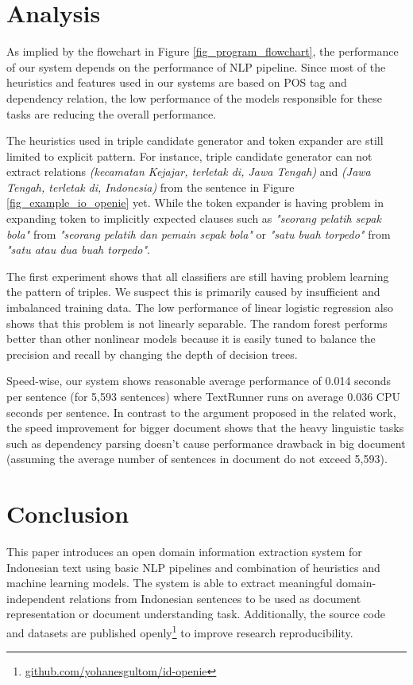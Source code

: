 \documentclass[conference,compsoc]{IEEEtran}
\begin{document}
\section{Analysis}

As implied by the flowchart in Figure \ref{fig_program_flowchart}, the performance of our system depends on the performance of NLP pipeline. Since most of the heuristics and features used in our systems are based on POS tag and dependency relation, the low performance of the models responsible for these tasks are reducing the overall performance.

The heuristics used in triple candidate generator and token expander are still limited to explicit pattern. For instance, triple candidate generator can not extract relations \textit{(kecamatan Kejajar, terletak di, Jawa Tengah)} and \textit{(Jawa Tengah, terletak di, Indonesia)} from the sentence in Figure \ref{fig_example_io_openie} yet. While the token expander is having problem in expanding token to implicitly expected clauses such as \textit{"seorang pelatih sepak bola"} from \textit{"seorang pelatih dan pemain sepak bola"} or \textit{"satu buah torpedo"} from \textit{"satu atau dua buah torpedo"}.

The first experiment shows that all classifiers are still having problem learning the pattern of triples. We suspect this is primarily caused by insufficient and imbalanced training data. The low performance of linear logistic regression also shows that this problem is not linearly separable. The random forest performs better than other nonlinear models because it is easily tuned to balance the precision and recall by changing the depth of decision trees.

Speed-wise, our system shows reasonable average performance of 0.014 seconds per sentence (for 5,593 sentences) where TextRunner runs on average 0.036 CPU seconds per sentence\cite{banko2007open}. In contrast to the argument proposed in the related work\cite{banko2007open}\cite{etzioni2011open}, the speed improvement for bigger document shows that the heavy linguistic tasks such as dependency parsing doesn't cause performance drawback in big document (assuming the average number of sentences in document do not exceed 5,593).

\section{Conclusion}

This paper introduces an open domain information extraction system for Indonesian text using basic NLP pipelines and combination of heuristics and machine learning models. The system is able to extract meaningful domain-independent relations from Indonesian sentences to be used as document representation or document understanding task. Additionally, the source code and datasets are published openly\footnote{\url{github.com/yohanesgultom/id-openie}} to improve research reproducibility.
\end{document}
